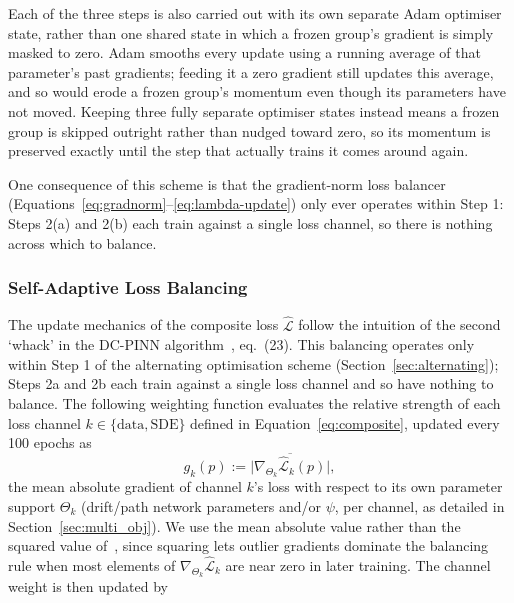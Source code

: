 \documentclass[11pt, a4paper]{article}
\newcommand{\todo}[1]{\textcolor{red}{\textbf{[TODO: #1]}}}
\begin{document}
Each of the three steps is also carried out with its own separate Adam
optimiser state, rather than one shared state in which a frozen group's
gradient is simply masked to zero. Adam smooths every update using a running
average of that parameter's past gradients; feeding it a zero gradient still
updates this average, and so would erode a frozen group's momentum even
though its parameters have not moved. Keeping three fully separate optimiser
states instead means a frozen group is skipped outright rather than nudged
toward zero, so its momentum is preserved exactly until the step that
actually trains it comes around again.

One consequence of this scheme is that the gradient-norm loss balancer
(Equations~\ref{eq:gradnorm}--\ref{eq:lambda-update}) only ever operates
within Step 1: Steps 2(a) and 2(b) each train against a single loss channel,
so there is nothing across which to balance.

\subsubsection*{Self-Adaptive Loss Balancing}


The update mechanics of the composite loss $\hat{\mathcal{L}}$ follow the
intuition of the second `whack' in the DC-PINN
algorithm~\cite{Hoshisashi2024Physics-InformedPDEs}, eq.\ (23). This balancing
operates only within Step 1 of the alternating optimisation scheme
(Section~\ref{sec:alternating}); Steps 2a and 2b each train against a single
loss channel and so have nothing to balance.
The following
weighting function evaluates the relative strength of each loss channel
$k \in \{\text{data}, \text{SDE}\}$ defined in
Equation~\ref{eq:composite}, updated every 100 epochs as
\begin{equation}
g_k(p) := \overline{\big\lvert \nabla_{\Theta_k} \hat{\mathcal{L}}_k(p) \big\rvert},
\label{eq:gradnorm}
\end{equation}
the mean absolute gradient of channel $k$'s loss with respect to its own
parameter support $\Theta_k$ (drift/path network parameters and/or $\psi$,
per channel, as detailed in Section~\ref{sec:multi_obj}). We use the mean
absolute value rather than the squared value
of~\cite{Hoshisashi2024Physics-InformedPDEs}, since squaring lets outlier
gradients dominate the balancing rule when most elements of
$\nabla_{\Theta_k}\hat{\mathcal{L}}_k$ are near zero in later training. The
channel weight is then updated by
\end{document}
